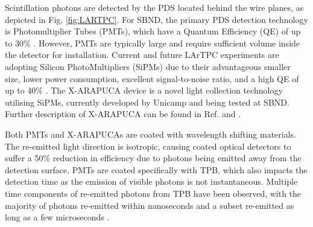 Scintillation photons are detected by the PDS located behind the wire planes, as depicted in Fig. \ref{fig:LARTPC}. 
For SBND, the primary PDS detection technology is Photomultiplier Tubes (PMTs), which have a Quantum Efficiency (QE) of up to 30\% \cite{pmt_qe}.
However, PMTs are typically large and require sufficient volume inside the detector for installation. 
Current and future LArTPC experiments are adopting Silicon PhotoMultipliers (SiPMs) due to their advantageous smaller size, lower power consumption, excellent signal-to-noise ratio, and a high QE of up to 40\% \cite{PatrickPhD, sipm_qe}.
The X-ARAPUCA device is a novel light collection technology utilising SiPMs, currently developed by Unicamp and being tested at SBND. 
Further description of X-ARAPUCA can be found in Ref. \cite{xarapuca} and \cite{sbnd_pds_paper}.

%

Both PMTs and X-ARAPUCAs are coated with wavelength shifting materials.
The re-emitted light direction is isotropic, causing coated optical detectors to suffer a 50\% reduction in efficiency due to photons being emitted away from the detection surface.
PMTs are coated specifically with TPB, which also impacts the detection time as the emission of visible photons is not instantaneous.
Multiple time components of re-emitted photons from TPB have been observed, with the majority of photons re-emitted within nanoseconds and a subset re-emitted as long as a few microseconds \cite{tpb_time}.

